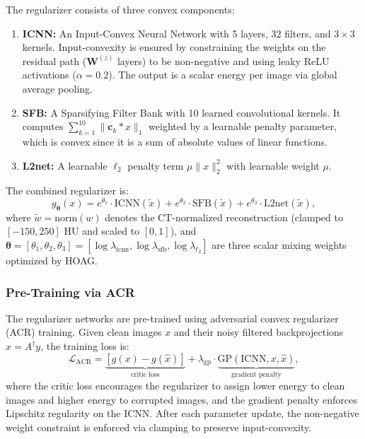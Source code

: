 The regularizer consists of three convex components:
\begin{enumerate}
    \item \textbf{ICNN:} An Input-Convex Neural Network with 5 layers, 32 filters, and $3\times3$ kernels. Input-convexity is ensured by constraining the weights on the residual path ($\mathbf{W}^{(z)}$ layers) to be non-negative and using leaky ReLU activations ($\alpha = 0.2$). The output is a scalar energy per image via global average pooling.
    \item \textbf{SFB:} A Sparsifying Filter Bank with 10 learned convolutional kernels. It computes $\sum_{k=1}^{10} \|\mathbf{c}_k * x\|_1$ weighted by a learnable penalty parameter, which is convex since it is a sum of absolute values of linear functions.
    \item \textbf{L2net:} A learnable $\ell_2$ penalty term $\mu \|x\|_2^2$ with learnable weight $\mu$.
\end{enumerate}

The combined regularizer is:
\begin{equation}
    g_{\boldsymbol{\theta}}(x) = e^{\theta_1} \cdot \text{ICNN}(\tilde{x}) + e^{\theta_2} \cdot \text{SFB}(\tilde{x}) + e^{\theta_3} \cdot \text{L2net}(\tilde{x}),
    \label{eq:icnn_reg}
\end{equation}
where $\tilde{w} = \text{norm}(w)$ denotes the CT-normalized reconstruction (clamped to $[-150, 250]$ HU and scaled to $[0, 1]$), and $\boldsymbol{\theta} = [\theta_1, \theta_2, \theta_3] = [\log \lambda_{\text{icnn}}, \log \lambda_{\text{sfb}}, \log \lambda_{\ell_2}]$ are three scalar mixing weights optimized by HOAG.

\subsubsection{Pre-Training via ACR}

The regularizer networks are pre-trained using adversarial convex regularizer (ACR) training. Given clean images $x$ and their noisy filtered backprojections $\hat{x} = A^\dagger y$, the training loss is:
\begin{equation}
    \mathcal{L}_{\text{ACR}} = \underbrace{\left[ g(x) - g(\hat{x}) \right]}_{\text{critic loss}} + \lambda_{\text{gp}} \cdot \underbrace{\text{GP}(\text{ICNN}, x, \hat{x})}_{\text{gradient penalty}},
    \label{eq:acr_loss}
\end{equation}
where the critic loss encourages the regularizer to assign lower energy to clean images and higher energy to corrupted images, and the gradient penalty enforces Lipschitz regularity on the ICNN. After each parameter update, the non-negative weight constraint is enforced via clamping to preserve input-convexity.

